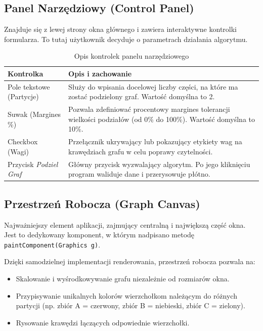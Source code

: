 \documentclass[12pt,a4paper]{article}
\begin{document}
\subsection{Panel Narzędziowy (Control Panel)}
Znajduje się z lewej strony okna głównego i zawiera interaktywne kontrolki formularza. To tutaj użytkownik decyduje o parametrach działania algorytmu.

\begin{table}[h]
    \centering
    \begin{tabularx}{\textwidth}{|l|X|}
    \hline
    \textbf{Kontrolka} & \textbf{Opis i zachowanie} \\ \hline
    Pole tekstowe (Partycje) & Służy do wpisania docelowej liczby części, na które ma zostać podzielony graf. Wartość domyślna to 2. \\ \hline
    Suwak (Margines \%) & Pozwala zdefiniować procentowy margines tolerancji wielkości podziałów (od 0\% do 100\%). Wartość domyślna to 10\%. \\ \hline
    Checkbox (Wagi) & Przełącznik ukrywający lub pokazujący etykiety wag na krawędziach grafu w celu poprawy czytelności. \\ \hline
    Przycisk \textit{Podziel Graf} & Główny przycisk wyzwalający algorytm. Po jego kliknięciu program waliduje dane i przerysowuje płótno. \\ \hline
    \end{tabularx}
    \caption{Opis kontrolek panelu narzędziowego}
\end{table}

\subsection{Przestrzeń Robocza (Graph Canvas)}
Najważniejszy element aplikacji, zajmujący centralną i największą część okna. Jest to dedykowany komponent, w którym nadpisano metodę \texttt{paintComponent(Graphics g)}. 

Dzięki samodzielnej implementacji renderowania, przestrzeń robocza pozwala na:
\begin{itemize}
    \item Skalowanie i wyśrodkowywanie grafu niezależnie od rozmiarów okna.
    \item Przypisywanie unikalnych kolorów wierzchołkom należącym do różnych partycji (np. zbiór A = czerwony, zbiór B = niebieski, zbiór C = zielony).
    \item Rysowanie krawędzi łączących odpowiednie wierzchołki.
\end{itemize}
\end{document}
